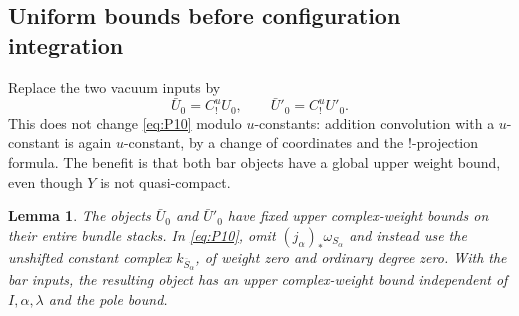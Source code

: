 \documentclass[11pt]{article}
\numberwithin{equation}{section}
\newtheorem{lemma}[theorem]{Lemma}
\theoremstyle{definition}
\theoremstyle{remark}
\begin{document}
\subsection{Uniform bounds before configuration integration}
\label{planch:uniform-bounds}

Replace the two vacuum inputs by
\[
 \bar U_0=C_!^uU_0,\qquad \bar U'_0=C_!^uU'_0.
\]
This does not change \eqref{eq:P10} modulo $u$-constants: addition
convolution with a $u$-constant is again $u$-constant, by a change
of coordinates and the $!$-projection formula.  The benefit is that
both bar objects have a global upper weight bound, even though $Y$
is not quasi-compact.

\begin{lemma}
\label{planch:vacuum-weight}
The objects $\bar U_0$ and $\bar U'_0$ have fixed upper complex-weight
bounds on their entire bundle stacks.  In \eqref{eq:P10}, omit
$(j_\alpha)_*\omega_{S_\alpha}$ and instead use the unshifted constant
complex $k_{\overline S_\alpha}$, of weight zero and ordinary degree
zero.  With the bar inputs, the resulting
object has an upper complex-weight bound independent of
$I,\alpha,\lambda$ and the pole bound.
\end{lemma}
\end{document}
